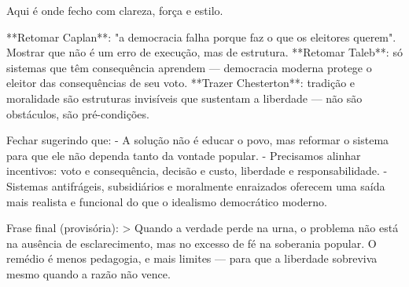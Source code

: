 Aqui é onde fecho com clareza, força e estilo.

**Retomar Caplan**: "a democracia falha porque faz o que os eleitores querem". Mostrar que não é um erro de execução, mas de estrutura.  
**Retomar Taleb**: só sistemas que têm consequência aprendem — democracia moderna protege o eleitor das consequências de seu voto.  
**Trazer Chesterton**: tradição e moralidade são estruturas invisíveis que sustentam a liberdade — não são obstáculos, são pré-condições.

Fechar sugerindo que:
- A solução não é educar o povo, mas reformar o sistema para que ele não dependa tanto da vontade popular.
- Precisamos alinhar incentivos: voto e consequência, decisão e custo, liberdade e responsabilidade.
- Sistemas antifrágeis, subsidiários e moralmente enraizados oferecem uma saída mais realista e funcional do que o idealismo democrático moderno.

Frase final (provisória):  
> Quando a verdade perde na urna, o problema não está na ausência de esclarecimento, mas no excesso de fé na soberania popular. O remédio é menos pedagogia, e mais limites — para que a liberdade sobreviva mesmo quando a razão não vence.



